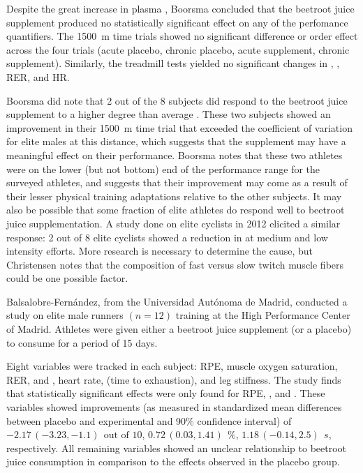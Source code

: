 Despite the great increase in plasma \notm, Boorsma concluded that the beetroot juice supplement produced no statistically significant effect on any of the perfomance quantifiers\cite[63]{boorsma2013effect}. The \SI{1500}{m} time trials showed no significant difference or order effect across the four trials (acute placebo, chronic placebo, acute supplement, chronic supplement). Similarly, the treadmill tests yielded no significant changes in \vot, \vcot, RER, and HR\cite{boorsma2013effect}.

Boorsma did note that 2 out of the 8 subjects did respond to the beetroot juice supplement to a higher degree than average \cite[69]{boorsma2013effect}. These two subjects showed an improvement in their \SI{1500}{m} time trial that exceeded the coefficient of variation for elite males at this distance\cite[60]{boorsma2013effect}, which suggests that the supplement may have a meaningful effect on their performance. Boorsma notes that these two athletes were on the lower (but not bottom) end of the performance range for the surveyed athletes, and suggests that their improvement may come as a result of their lesser physical training adaptations relative to the other subjects\cite[61]{boorsma2013effect}. It may also be possible that some fraction of elite athletes do respond well to beetroot juice supplementation. A study done on elite cyclists in 2012 elicited a similar response: 2 out of 8 elite cyclists showed a reduction in \vot at medium and low intensity efforts\cite[8]{christensen2013influence}. More research is necessary to determine the cause, but Christensen notes that the composition of fast versus slow twitch muscle fibers could be one possible factor\cite[8]{christensen2013influence}.

Balsalobre-Fern\'andez, from the Universidad Aut\'onoma de Madrid, conducted a study on elite male runners $(n=12)$ training at the High Performance Center of Madrid. Athletes were given either a beetroot juice supplement (or a placebo) to consume for a period of 15 days.

Eight variables were tracked in each subject: RPE, muscle oxygen saturation, RER, \vot{} and \votmax, heart rate, \tex{} (time to exhaustion), and leg stiffness. The study finds that statistically significant effects were only found for RPE, \smo, and \tex. These variables showed improvements (as measured in standardized mean differences between placebo and experimental and 90\% confidence interval) of
${-2.17\,(-3.23,-1.1)}\ \SI{}{\textrm{out of 10}}$,
${0.72\,(0.03,1.41)}\ \SI{}{\%}$,
${1.18\,(-0.14,2.5)}\ \SI{}{s}$,
respectively.
All remaining variables showed an unclear relationship to beetroot juice consumption in comparison to the effects observed in the placebo group. 

